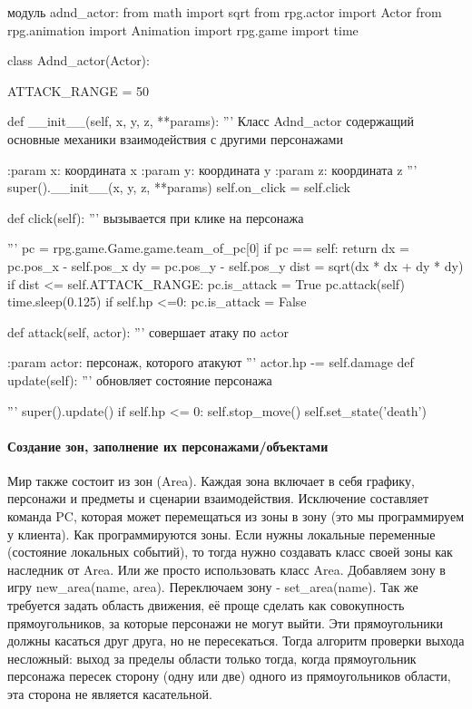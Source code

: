 модуль adnd\_actor:
from math import sqrt
from rpg.actor import Actor
from rpg.animation import Animation
import rpg.game
import time

class Adnd\_actor(Actor):

ATTACK\_RANGE = 50

def \_\_init\_\_(self, x, y, z, **params):
'''
Класс Adnd\_actor содержащий основные механики взаимодействия с другими персонажами

:param x: координата x
:param y: координата y
:param z: координата z
'''
super().\_\_init\_\_(x, y, z, **params)
self.on\_click = self.click

def click(self):
'''
вызывается при клике на персонажа

'''
pc = rpg.game.Game.game.team\_of\_pc[0]
if pc == self:
return
dx = pc.pos\_x - self.pos\_x
dy = pc.pos\_y - self.pos\_y
dist = sqrt(dx * dx + dy * dy)
if dist <= self.ATTACK\_RANGE:
pc.is\_attack = True
pc.attack(self)
time.sleep(0.125)
if self.hp <=0:
pc.is\_attack = False

def attack(self, actor):
'''
совершает атаку по actor

:param actor: персонаж, которого атакуют
'''
actor.hp -= self.damage
def update(self):
'''
обновляет состояние персонажа

'''
super().update()
if self.hp <= 0:
self.stop\_move()
self.set\_state('death')


\paragraph{Создание зон, заполнение их персонажами/объектами}
Мир также состоит из зон (Area). Каждая зона включает в себя графику, персонажи и предметы и сценарии взаимодействия. Исключение составляет команда PC, которая может перемещаться из зоны в зону (это мы программируем у клиента). Как программируются зоны. Если нужны локальные переменные (состояние локальных событий), то тогда нужно создавать класс своей зоны как наследник от Area. Или же просто использовать класс Area. Добавляем зону в игру new\_area(name, area). Переключаем зону - set\_area(name). Так же требуется задать область движения, её проще сделать как совокупность прямоугольников, за которые персонажи не могут выйти. Эти прямоугольники должны касаться друг друга, но не пересекаться. Тогда алгоритм проверки выхода несложный: выход за пределы области только тогда, когда прямоугольник персонажа пересек сторону (одну или две) одного из прямоугольников области, эта сторона не является касательной.

